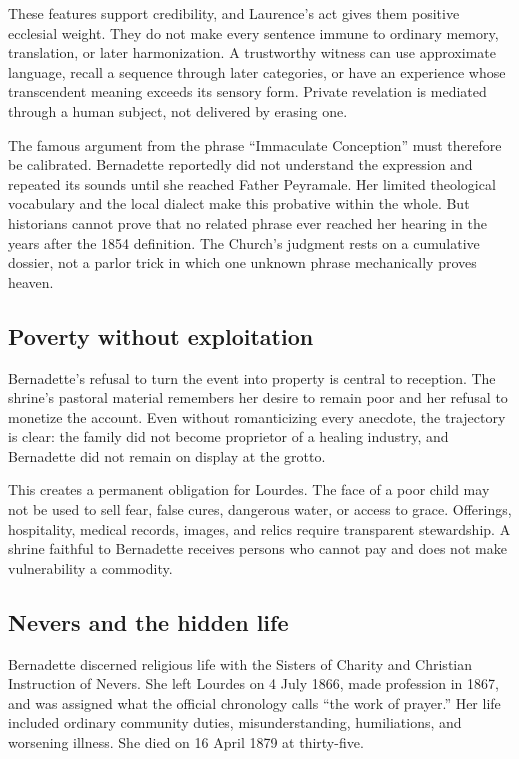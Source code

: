 These features support credibility, and Laurence's act gives them positive ecclesial weight. They do not make every sentence immune to ordinary memory, translation, or later harmonization. A trustworthy witness can use approximate language, recall a sequence through later categories, or have an experience whose transcendent meaning exceeds its sensory form. Private revelation is mediated through a human subject, not delivered by erasing one.

The famous argument from the phrase “Immaculate Conception” must therefore be calibrated. Bernadette reportedly did not understand the expression and repeated its sounds until she reached Father Peyramale. Her limited theological vocabulary and the local dialect make this probative within the whole. But historians cannot prove that no related phrase ever reached her hearing in the years after the 1854 definition. The Church's judgment rests on a cumulative dossier, not a parlor trick in which one unknown phrase mechanically proves heaven.

\subsection{Poverty without exploitation}

Bernadette's refusal to turn the event into property is central to reception. The shrine's pastoral material remembers her desire to remain poor and her refusal to monetize the account. Even without romanticizing every anecdote, the trajectory is clear: the family did not become proprietor of a healing industry, and Bernadette did not remain on display at the grotto.

This creates a permanent obligation for Lourdes. The face of a poor child may not be used to sell fear, false cures, dangerous water, or access to grace. Offerings, hospitality, medical records, images, and relics require transparent stewardship. A shrine faithful to Bernadette receives persons who cannot pay and does not make vulnerability a commodity.

\subsection{Nevers and the hidden life}

Bernadette discerned religious life with the Sisters of Charity and Christian Instruction of Nevers. She left Lourdes on 4 July 1866, made profession in 1867, and was assigned what the official chronology calls “the work of prayer.” Her life included ordinary community duties, misunderstanding, humiliations, and worsening illness. She died on 16 April 1879 at thirty-five.

